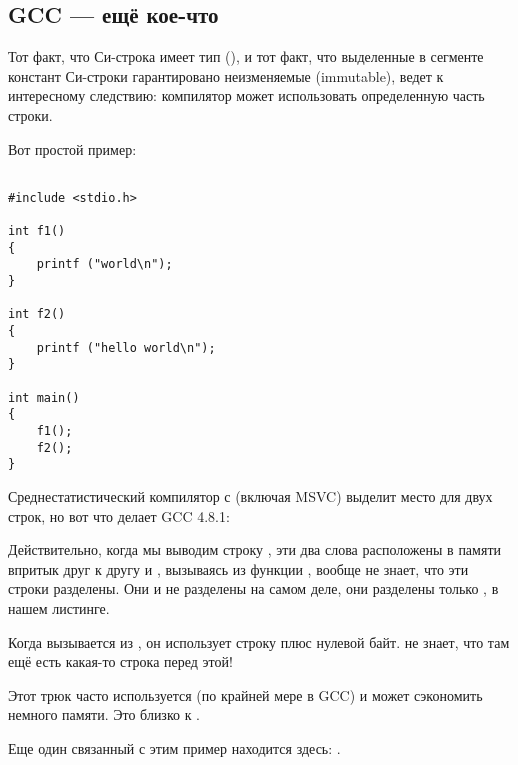 \subsection{GCC --- ещё кое-что}
\label{use_parts_of_C_strings}

Тот факт, что  Си-строка имеет тип  (), 
и тот факт, что выделенные в сегменте констант Си-строки гарантировано неизменяемые (immutable), 
ведет к интересному следствию: компилятор может использовать определенную часть строки.

Вот простой пример:

\begin{lstlisting}[style=customc]

#include <stdio.h>

int f1()
{
	printf ("world\n");
}

int f2()
{
	printf ("hello world\n");
}

int main()
{
	f1();
	f2();
}
\end{lstlisting}

Среднестатистический компилятор с \CCpp (включая MSVC) выделит место для двух строк, но вот что делает GCC 4.8.1:



Действительно, когда мы выводим строку , 
эти два слова расположены в памяти впритык друг к другу и \puts, вызываясь из функции , вообще не знает,
что эти строки разделены. Они и не разделены на самом деле, они разделены
только , в нашем листинге.

Когда \puts вызывается из , он использует строку  плюс нулевой байт. \puts не знает, что там ещё есть какая-то строка перед этой!

Этот трюк часто используется (по крайней мере в GCC) и может сэкономить немного памяти.
Это близко к .

Еще один связанный с этим пример находится здесь: .

